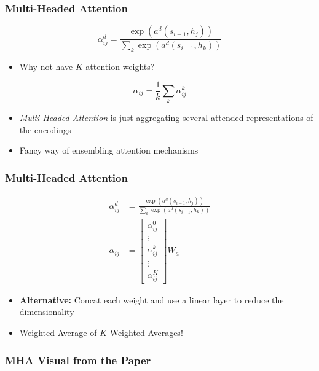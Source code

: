\documentclass[usenames,dvipsnames]{beamer}
\begin{document}
\begin{frame}
\frametitle{Multi-Headed Attention}
\begin{equation*}
  \alpha_{ij}^d = \frac{\exp\left(a^d\left(s_{i-1}, h_j\right)\right)}{\sum_k \exp \left( a^d \left(s_{i-1}, h_k\right) \right)}
\end{equation*}
\begin{itemize}
  \item Why not have $K$ attention weights?
\end{itemize}
\begin{equation*}
  \alpha_{ij} = \frac{1}{k} \sum_k \alpha^k_{ij}
\end{equation*}
\begin{itemize}
  \item \textit{Multi-Headed Attention} is just aggregating several attended representations of the encodings
  \item Fancy way of ensembling attention mechanisms
\end{itemize}
\end{frame}

\begin{frame}
  \frametitle{Multi-Headed Attention}
  \begin{equation*}
    \begin{split}
    \alpha_{ij}^d &= \frac{\exp\left(a^d\left(s_{i-1}, h_j\right)\right)}{\sum_k \exp \left( a^d \left(s_{i-1}, h_k\right) \right)}\\
    \alpha_{ij} &= \begin{bmatrix*} \alpha^0_{ij} \\ \vdots \\ \alpha^k_{ij} \\ \vdots \\ \alpha^K_{ij} \end{bmatrix*} W_a
  \end{split}
  \end{equation*}
  \begin{itemize}
    \item \textbf{Alternative:} Concat each weight and use a linear layer to reduce the dimensionality
    \item Weighted Average of $K$ Weighted Averages!
  \end{itemize}
\end{frame}

\begin{frame}
  \frametitle{MHA Visual from the Paper}

\end{frame}
\end{document}
